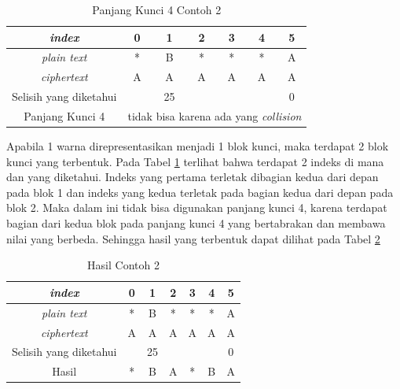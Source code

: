 	\begin{table}[H]
	 	\centering
	 	\caption{Panjang Kunci 4 Contoh 2}
	 	\setlength{\arrayrulewidth}{.08em}
	 	\begin{tabular}{|c|c|c|c|c|c|c|}\hline
		\textit{index}&0&1&2&3&4&5\\ \hline
	 	\textit{plain text}&\cellcolor{blue!15}*&\cellcolor{blue!15}B&\cellcolor{blue!15}*&\cellcolor{blue!15}*&\cellcolor{green!15}*&\cellcolor{green!15}A\\ \hline
	 	\textit{ciphertext}&\cellcolor{blue!15}A&\cellcolor{blue!15}A&\cellcolor{blue!15}A&\cellcolor{blue!15}A&\cellcolor{green!15}A&\cellcolor{green!15}A\\ \hline
	 	Selisih yang diketahui& &25& & & &0\\ \hline
	 	Panjang Kunci 4 & \multicolumn{6}{c|}{tidak bisa karena ada yang \textit{collision}}\\ \hline
	 	\end{tabular}
	 	\label{tab:k4contoh2}
	\end{table}	
	Apabila 1 warna direpresentasikan menjadi 1 blok kunci, maka terdapat 2 blok kunci yang terbentuk. Pada Tabel \ref{tab:k4contoh2} terlihat bahwa terdapat 2 indeks di mana \plaintext dan \ciphertext yang diketahui. Indeks yang pertama terletak dibagian kedua dari depan pada blok 1 dan indeks yang kedua terletak pada bagian kedua dari depan pada blok 2. Maka dalam ini tidak bisa digunakan panjang kunci 4, karena terdapat bagian dari kedua blok pada panjang kunci 4 yang bertabrakan dan membawa nilai yang berbeda. Sehingga hasil yang terbentuk dapat dilihat pada Tabel \ref{tab:rescontoh2}
	
	\begin{table}[H]
	 	\centering
	 	\caption{Hasil Contoh 2}
	 	\setlength{\arrayrulewidth}{.08em}
	 	\begin{tabular}{|c|c|c|c|c|c|c|}\hline
		\textit{index}&0&1&2&3&4&5\\ \hline
	 	\textit{plain text}&*&B&*&*&*&A\\ \hline
	 	\textit{ciphertext}&A&A&A&A&A&A\\ \hline
	 	Selisih yang diketahui& &25& & & &0\\ \hline
	 	Hasil &*&B&A&*&B&A \\ \hline
	 	\end{tabular}
	 	\label{tab:rescontoh2}
	\end{table}	 
	
